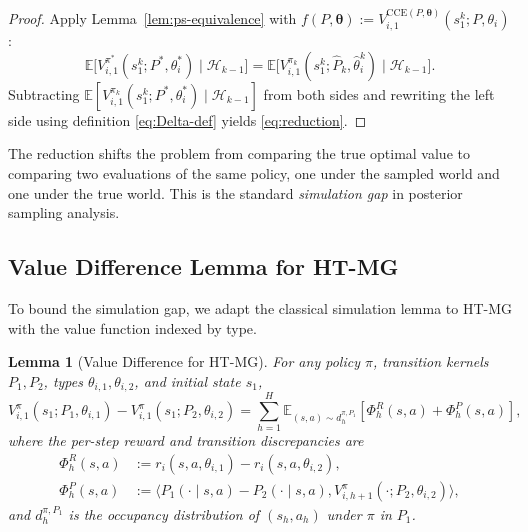 \documentclass{article}
\newtheorem{lemma}[theorem]{Lemma}
\begin{document}
\begin{proof}
Apply Lemma~\ref{lem:ps-equivalence} with $f(P, \boldsymbol{\theta}) := V_{i,1}^{\mathrm{CCE}(P, \boldsymbol{\theta})}(s_1^k; P, \theta_i)$:
\begin{equation}
\mathbb{E}\big[V_{i,1}^{\pi^*}(s_1^k; P^*, \theta_i^*) \mid \mathcal{H}_{k-1}\big] = \mathbb{E}\big[V_{i,1}^{\pi_k}(s_1^k; \hat{P}_k, \hat{\theta}_i^k) \mid \mathcal{H}_{k-1}\big].
\end{equation}
Subtracting $\mathbb{E}[V_{i,1}^{\pi_k}(s_1^k; P^*, \theta_i^*) \mid \mathcal{H}_{k-1}]$ from both sides and rewriting the left side using definition \eqref{eq:Delta-def} yields \eqref{eq:reduction}.
\end{proof}

The reduction shifts the problem from comparing the true optimal value to comparing two evaluations of the same policy, one under the sampled world and one under the true world. This is the standard \textit{simulation gap} in posterior sampling analysis.

\subsection{Value Difference Lemma for HT-MG}

To bound the simulation gap, we adapt the classical simulation lemma \citep{kearns2002near,bai2020provable} to HT-MG with the value function indexed by type.

\begin{lemma}[Value Difference for HT-MG]
\label{lem:value-diff}
For any policy $\pi$, transition kernels $P_1, P_2$, types $\theta_{i,1}, \theta_{i,2}$, and initial state $s_1$,
\begin{equation}
\label{eq:value-diff}
V_{i,1}^{\pi}(s_1; P_1, \theta_{i,1}) - V_{i,1}^{\pi}(s_1; P_2, \theta_{i,2}) = \sum_{h=1}^{H} \mathbb{E}_{(s,a) \sim d_h^{\pi, P_1}}\left[\Phi_h^R(s,a) + \Phi_h^P(s,a)\right],
\end{equation}
where the per-step reward and transition discrepancies are
\begin{align}
\Phi_h^R(s,a) &:= r_i(s, a, \theta_{i,1}) - r_i(s, a, \theta_{i,2}), \label{eq:phi-r}\\
\Phi_h^P(s,a) &:= \big\langle P_1(\cdot \mid s, a) - P_2(\cdot \mid s, a), V_{i,h+1}^{\pi}(\cdot; P_2, \theta_{i,2})\big\rangle, \label{eq:phi-p}
\end{align}
and $d_h^{\pi, P_1}$ is the occupancy distribution of $(s_h, a_h)$ under $\pi$ in $P_1$.
\end{lemma}
\end{document}
